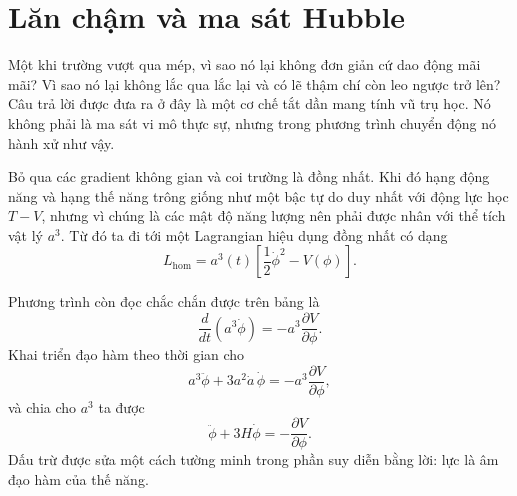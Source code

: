 \begin{classroomqa}
\end{classroomqa}

\begin{classroomqa}
\end{classroomqa}

\section{Lăn chậm và ma sát Hubble}

Một khi trường vượt qua mép, vì sao nó lại không đơn giản cứ dao động mãi mãi? Vì sao nó lại không lắc qua lắc lại và có lẽ thậm chí còn leo ngược trở lên? Câu trả lời được đưa ra ở đây là một cơ chế tắt dần mang tính vũ trụ học. Nó không phải là ma sát vi mô thực sự, nhưng trong phương trình chuyển động nó hành xử như vậy.

Bỏ qua các gradient không gian và coi trường là đồng nhất. Khi đó hạng động năng và hạng thế năng trông giống như một bậc tự do duy nhất với động lực học \(T-V\), nhưng vì chúng là các mật độ năng lượng nên phải được nhân với thể tích vật lý \(a^3\). Từ đó ta đi tới một Lagrangian hiệu dụng đồng nhất có dạng
\begin{equation}
L_{\mathrm{hom}}=a^3(t)\left[\frac12\dot\phi^2-V(\phi)\right].
\end{equation}

Phương trình còn đọc chắc chắn được trên bảng là
\begin{equation}
\frac{d}{dt}\left(a^3\dot\phi\right)=-a^3\frac{\partial V}{\partial\phi}.
\end{equation}
Khai triển đạo hàm theo thời gian cho
\begin{equation}
a^3\ddot\phi+3a^2\dot a\,\dot\phi=-a^3\frac{\partial V}{\partial\phi},
\end{equation}
và chia cho \(a^3\) ta được
\begin{equation}
\ddot\phi+3H\dot\phi=-\frac{\partial V}{\partial\phi}.
\end{equation}
Dấu trừ được sửa một cách tường minh trong phần suy diễn bằng lời: lực là âm đạo hàm của thế năng.

